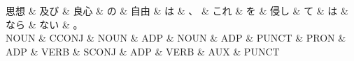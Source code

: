 \documentclass[tikz,border=5pt]{standalone}
\begin{document}
\normalsize
\begin{dependency}[edge unit distance=12.0pt]
    \begin{deptext}[column sep=1em]
        思想 \& 及び \& 良心 \& の \& 自由 \& は \& 、 \& これ \& を \& 侵し \& て \& は \& なら \& ない \& 。\\
        NOUN \& CCONJ \& NOUN \& ADP \& NOUN \& ADP \& PUNCT \& PRON \& ADP \& VERB \& SCONJ \& ADP \& VERB \& AUX \& PUNCT\\
    \end{deptext}
\end{dependency}
\end{document}
